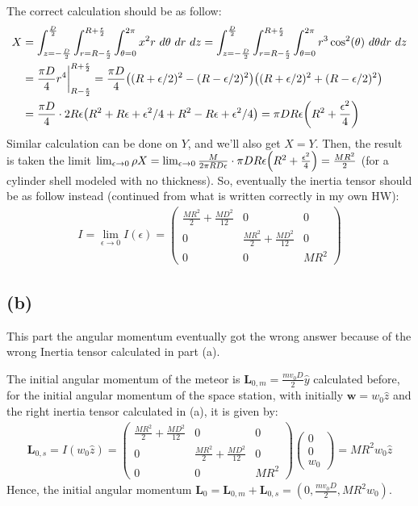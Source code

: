 \documentclass{article}
\DeclarePairedDelimiter{\paran}{(}{)}%
\newcommand{\bL}{\textbf{L}} %
\newcommand{\bw}{\textbf{w}} %
\begin{document}
The correct calculation should be as follow:
\begin{align}
    X &= \int_{z=-\frac{D}{2}}^{\frac{D}{2}}\int_{r=R-\frac{\epsilon}{2}}^{R+\frac{\epsilon}{2}}\int_{\theta=0}^{2\pi} x^2r\ d\theta\ dr\ dz = \int_{z=-\frac{D}{2}}^{\frac{D}{2}}\int_{r=R-\frac{\epsilon}{2}}^{R+\frac{\epsilon}{2}}\int_{\theta=0}^{2\pi}r^3\cos^2(\theta)\ d\theta dr\ dz\\
    &= \frac{\pi D}{4}r^4\bigg|_{R-\frac{\epsilon}{2}}^{R+\frac{\epsilon}{2}} = \frac{\pi D}{4}\paran*{(R+\epsilon/2)^2-(R-\epsilon/2)^2}\paran*{(R+\epsilon/2)^2+(R-\epsilon/2)^2}\\
    &= \frac{\pi D}{4}\cdot 2R\epsilon\paran*{R^2+R\epsilon + \epsilon^2/4 + R^2 - R\epsilon + \epsilon^2/4} = \pi DR\epsilon\paran*{R^2+\frac{\epsilon^2}{4}}
\end{align}
Similar calculation can be done on $Y$, and we'll also get $X=Y$. Then, the result is taken the limit $\lim_{\epsilon\rightarrow 0}\rho X = \lim_{\epsilon\rightarrow 0}\frac{M}{2\pi RD\epsilon}\cdot \pi DR\epsilon\paran*{R^2+\frac{\epsilon^2}{4}} = \frac{MR^2}{2}$ (for a cylinder shell modeled with no thickness). So, eventually the inertia tensor should be as follow instead (continued from what is written correctly in my own HW):
\begin{align}
    I = \lim_{\epsilon\rightarrow 0} I(\epsilon)= \begin{pmatrix}
        \frac{MR^2}{2}+\frac{MD^2}{12} &0&0\\
        0& \frac{MR^2}{2}+\frac{MD^2}{12} &0\\
        0&0& MR^2
    \end{pmatrix}
\end{align}

\subsection*{(b)}
This part the angular momentum eventually got the wrong answer because of the wrong Inertia tensor calculated in part (a).

The initial angular momentum of the meteor is $\bL_{0,m}=\frac{mv_0D}{2}\hat{y}$ calculated before, for the initial angular momentum of the space station, with initially $\bw = w_0\hat{z}$ and the right inertia tensor calculated in (a), it is given by:
\begin{align}
    \bL_{0,s}=I(w_0\hat{z})=\begin{pmatrix}
        \frac{MR^2}{2}+\frac{MD^2}{12} &0&0\\
        0& \frac{MR^2}{2}+\frac{MD^2}{12} &0\\
        0&0& MR^2
    \end{pmatrix}\begin{pmatrix}
        0\\0\\w_0
    \end{pmatrix} = MR^2w_0\hat{z}
\end{align}
Hence, the initial angular momentum $\bL_0 = \bL_{0,m}+\bL_{0,s} = (0,\frac{mv_0D}{2},MR^2w_0)$. 
\end{document}
